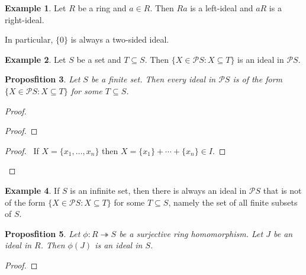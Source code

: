 \documentclass{book}
\let\qed\relax
\newtheorem{prop}{Proposfition}[chapter]
\theoremstyle{definition}
\newtheorem{ex}[prop]{Example}
\begin{document}
\begin{ex}
Let $R$ be a ring and $a \in R$. Then $Ra$ is a left-ideal and $aR$ is a right-ideal.

In particular, $\{0\}$ is always a two-sided ideal.
\end{ex}

\begin{ex}
Let $S$ be a set and $T \subseteq S$. Then $\{ X \in \mathcal{P} S : X \subseteq T \}$ is an ideal in $\mathcal{P} S$.
\end{ex}

\begin{prop}
Let $S$ be a finite set. Then every ideal in $\mathcal{P} S$ is of the form $\{ X \in \mathcal{P} S : X \subseteq T \}$ for some $T \subseteq S$.
\end{prop}

\begin{proof}
\pf
{}
\begin{proof}
\end{proof}
\begin{proof}
	\pf\ If $X = \{x_1, \ldots, x_n\}$ then $X = \{x_1\} + \cdots + \{x_n\} \in I$.
\end{proof}
\qed
\end{proof}

\begin{ex}
If $S$ is an infinite set, then there is always an ideal in $\mathcal{P} S$ that is not of the form $\{X \in \mathcal{P} S : X \subseteq T \}$ for some $T \subseteq S$, namely the set of all finite subsets of $S$.
\end{ex}

\begin{prop}
Let $\phi : R \twoheadrightarrow S$ be a surjective ring homomorphism. Let $J$ be an ideal in $R$. Then $\phi(J)$ is an ideal in $S$.
\end{prop}

\begin{proof}
\pf
{}
\qed
\end{proof}
\end{document}
